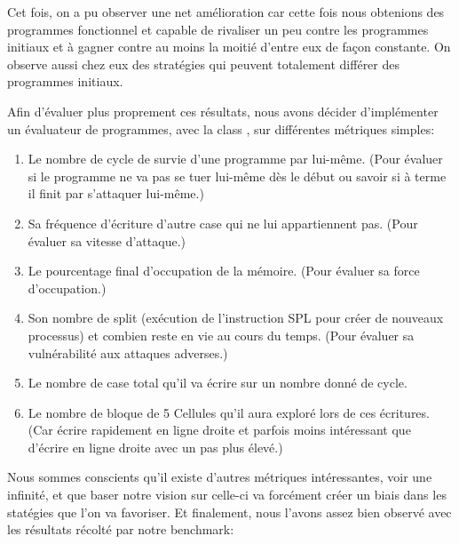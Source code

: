 \documentclass[a4paper,12pt]{article} %
\begin{document}
Cet fois, on a pu observer une net amélioration car cette fois nous obtenions des programmes fonctionnel et capable de rivaliser un peu contre les programmes initiaux et à gagner contre au moins la moitié d'entre eux de façon constante. On observe aussi chez eux des stratégies qui peuvent totalement différer des programmes initiaux.

Afin d'évaluer plus proprement ces résultats, nous avons décider d'implémenter un évaluateur de programmes, avec la class , sur différentes métriques simples:
\begin{enumerate}
	\item Le nombre de cycle de survie d'une programme par lui-même. (Pour évaluer si le programme ne va pas se tuer lui-même dès le début ou savoir si à terme il finit par s'attaquer lui-même.)
	\item Sa fréquence d'écriture d'autre case qui ne lui appartiennent pas. (Pour évaluer sa vitesse d'attaque.)
	\item Le pourcentage final d'occupation de la mémoire. (Pour évaluer sa force d'occupation.)
	\item Son nombre de split (exécution de l'instruction SPL pour créer de nouveaux processus) et combien reste en vie au cours du temps. (Pour évaluer sa vulnérabilité aux attaques adverses.)
	\item Le nombre de case total qu'il va écrire sur un nombre donné de cycle.
	\item Le nombre de bloque de 5 Cellules qu'il aura exploré lors de ces écritures. (Car écrire rapidement en ligne droite et parfois moins intéressant que d'écrire en ligne droite avec un pas plus élevé.)
\end{enumerate}

Nous sommes conscients qu'il existe d'autres métriques intéressantes, voir une infinité, et que baser notre vision sur celle-ci va forcément créer un biais dans les statégies que l'on va favoriser. Et finalement, nous l'avons assez bien observé avec les résultats récolté par notre benchmark:

\newpage
\end{document}
